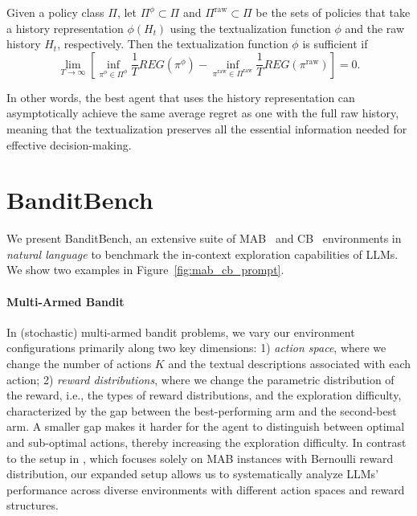 \begin{defn} 
Given a policy class $\Pi$, let $\Pi^\phi \subset \Pi$ and $\Pi^\text{raw} \subset \Pi$ be the sets of policies that take a history representation $\phi(H_t)$ using the textualization function $\phi$ and the raw history $H_t$, respectively. Then the textualization function $\phi$ is sufficient if
$$
\lim_{T \to \infty} \left[ \inf_{\pi^\phi \in \Pi^\phi} \frac{1}{T} REG(\pi^\phi) - \inf_{\pi^\text{raw} \in \Pi^\text{raw}} \frac{1}{T} REG(\pi^\text{raw})\right] = 0.
$$
\label{def:sufficient}
\end{defn} 
In other words, the best agent that uses the history representation can asymptotically achieve the same average regret as one with the full raw history, meaning that the textualization preserves all the essential information needed for effective decision-making.

\section{BanditBench}
\label{subsec: banditbench}
We present BanditBench, an extensive suite of MAB~\citep{slivkins2019introduction} and CB~\citep{li2010contextual} environments in \emph{natural language} to benchmark the in-context exploration capabilities of LLMs. We show two examples in Figure~\ref{fig:mab_cb_prompt}. 
\paragraph{Multi-Armed Bandit}

In (stochastic) multi-armed bandit problems, we vary our environment configurations primarily along two key dimensions:
1) \emph{action space}, where we change the number of actions $K$ and the textual descriptions associated with each action; 2) \emph{reward distributions}, where we change the parametric distribution of the reward, i.e., the types of reward distributions, and the exploration difficulty, characterized by the gap between the best-performing arm and the second-best arm. A smaller gap makes it harder for the agent to distinguish between optimal and sub-optimal actions, thereby increasing the exploration difficulty.
In contrast to the setup in \citet{krishnamurthy2024can}, which focuses solely on MAB instances with Bernoulli reward distribution, our expanded setup allows us to systematically analyze LLMs' performance across diverse environments with different action spaces and reward structures. %


